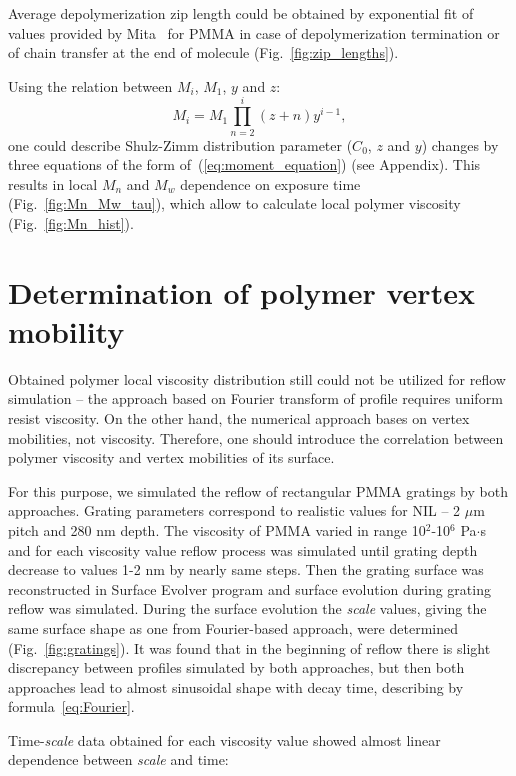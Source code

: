 \documentclass[12pt]{iopart}
\begin{document}
Average depolymerization zip length could be obtained by exponential fit of values provided by Mita~\cite{Mita_PMMA_zip_lengths_T} for PMMA in case of depolymerization termination or of chain transfer at the end of molecule (Fig.~\ref{fig:zip_lengths}).


\noindent Using the relation between $M_i$, $M_1$, $y$ and $z$:
\begin{equation}
	M_i=M_1 \prod_{n=2}^i(z+n) y^{i-1},
\end{equation}
one could describe Shulz-Zimm distribution parameter ($C_0$, $z$ and $y$) changes by three equations of the form of~(\ref{eq:moment_equation}) (see Appendix). This results in local $M_n$ and $M_w$ dependence on exposure time (Fig.~\ref{fig:Mn_Mw_tau}), which allow to calculate local polymer viscosity (Fig.~\ref{fig:Mn_hist}).


\section{Determination of polymer vertex mobility}
Obtained polymer local viscosity distribution still could not be utilized for reflow simulation -- the approach based on Fourier transform of profile requires uniform resist viscosity. On the other hand, the numerical approach bases on vertex mobilities, not viscosity. Therefore, one should introduce the correlation between polymer viscosity and vertex mobilities of its surface.

For this purpose, we simulated the reflow of rectangular PMMA gratings by both approaches. Grating parameters correspond to realistic values for NIL -- 2 $\mu$m pitch and 280 nm depth. The viscosity of PMMA varied in range 10$^2$-10$^6$ Pa$\cdot$s and for each viscosity value reflow process was simulated until grating depth decrease to values 1-2 nm by nearly same steps. Then the grating surface was reconstructed in Surface Evolver program and surface evolution during grating reflow was simulated. During the surface evolution the \textit{scale} values, giving the same surface shape as one from Fourier-based approach, were determined (Fig.~\ref{fig:gratings}). It was found that in the beginning of reflow there is slight discrepancy between profiles simulated by both approaches, but then both approaches lead to almost sinusoidal shape with decay time, describing by formula~\ref{eq:Fourier}.


Time-\textit{scale} data obtained for each viscosity value showed almost linear dependence between \textit{scale} and time:
\end{document}
